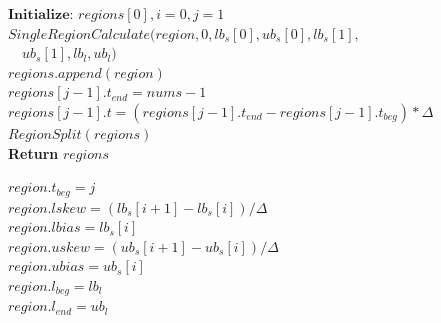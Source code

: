 \documentclass[UTF8,a4paper,12pt,fontset=none]{ctexart}
\theoremstyle{definition}
\theoremstyle{plain}
\theoremstyle{plain}
\theoremstyle{plain}
\begin{document}
\begin{algorithm}[htbp]
\small
\caption{Convexify2D}\label{alg:two}
\setcounter{AlgoLine}{0}
\LinesNumbered
{}


$\textbf{Initialize: } regions[0], i = 0, j = 1$ 
$SingleRegionCalculate(region,0,lb_s[0],ub_s[0],lb_s[1],$\\\ \ $ub_s[1], lb_l, ub_l)$\\
$regions.append(region)$
\\
$regions[j-1].t_{end} = nums-1$\\
$regions[j-1].t = (regions[j-1].t_{end} - regions[j-1].t_{beg})*\Delta$\\
$RegionSplit(regions)$\\
\textbf{Return} {$regions$}
\end{algorithm}
\begin{algorithm}[htbp]
\caption{Single Region Caculate}
\setcounter{AlgoLine}{0}
\LinesNumbered
{}
 $region.t_{beg} = j$\\
 $region.lskew = (lb_s[i + 1] - lb_s[i])/\Delta$\\
 $region.lbias = lb_s[i]$\\
 $region.uskew = (ub_s[i + 1] - ub_s[i])/\Delta$\\
 $region.ubias = ub_s[i]$\\
 $region.l_{beg} = lb_l$\\
 $region.l_{end} = ub_l$\\
\end{algorithm}
\end{document}
